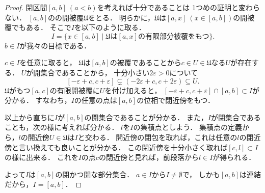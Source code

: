 \documentclass[]{jsarticle}
\newcommand{\U}{\mathfrak{U}}
\begin{document}
\begin{proof}
    閉区間$[a,b] ~(a<b)$を考えれば十分であることは
    1つめの証明と変わらない．
    $[a,b]$のの開被覆$\U$をとる．
    明らかに，$\U$は$[a,x] ~(x \in [a,b])$の開被覆でもある．
    そこで$I$を以下のように取る．
    \[ I=\{ x \in [a,b] \mid \text{$\U$は$[a,x]$の有限部分被覆をもつ}\}. \]
    $b \in I$が我々の目標である．

    $c \in I$を任意に取ると，
    $\U$は$[a,b]$の被覆であることから$c \in U \in \U$なる$U$が存在する．
    $U$が開集合であることから，
    十分小さい$2\varepsilon>0$について
    \[ [-\varepsilon+c, c+\varepsilon] \subsetneq (-2\varepsilon+c, c+2\varepsilon) \subseteq U. \]
    $\U$がもつ$[a,c]$の有限開被覆に$U$を付け加えると，
    $[-\varepsilon+c, c+\varepsilon] \cap [a,b] \subset I$が分かる．
    すなわち，$I$の任意の点は$[a,b]$の位相で閉近傍をもつ．

    以上から直ちに$I$が$[a,b]$の開集合であることが分かる．
    また，$I$が閉集合であることも，次の様に考えれば分かる．
    $l$を$I$の集積点としよう．
    集積点の定義から，$l$の開近傍$U \in \U$は$I$と交わる．
    開近傍の閉包を取れば，これは任意の$l$の閉近傍と言い換えても良いことが分かる．
    この閉近傍を十分小さく取れば$[c,l] \subset I$の様に出来る．
    これを$I$の点$c$の閉近傍と見れば，前段落から$l \in I$が得られる．

    よって$I$は$[a,b]$の閉かつ開な部分集合．
    $a \in I$から$I \neq \emptyset$で，
    しかも$[a,b]$は連結だから，$I=[a,b]$．
\end{proof}
\end{document}
